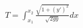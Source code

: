 \documentclass[preview]{standalone}
\begin{document}
\begin{align*}
T = \int_{x_1}^{x_2} \frac{\sqrt{1+(y')^2}}{\sqrt{2gy}} dx
\end{align*}
\end{document}
